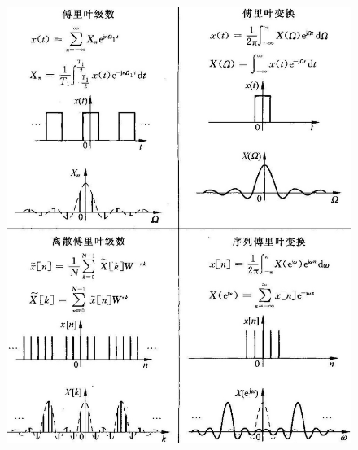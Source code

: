 \vspace{-10pt}
\begin{figure}[H]
    \centering
    \includegraphics[width=\linewidth]{figure/Pasted image 20220611010632.jpg}
\end{figure}